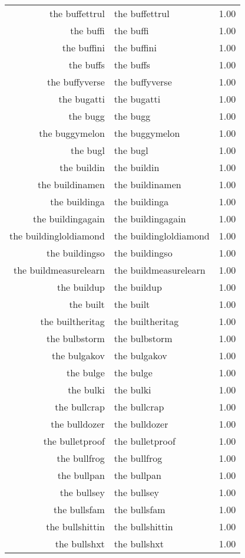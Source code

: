 \begin{table}[ht]
\begin{tabular}{rlr}
  the buffettrul & the buffettrul & 1.00 \\ 
  the buffi & the buffi & 1.00 \\ 
  the buffini & the buffini & 1.00 \\ 
  the buffs & the buffs & 1.00 \\ 
  the buffyverse & the buffyverse & 1.00 \\ 
  the bugatti & the bugatti & 1.00 \\ 
  the bugg & the bugg & 1.00 \\ 
  the buggymelon & the buggymelon & 1.00 \\ 
  the bugl & the bugl & 1.00 \\ 
  the buildin & the buildin & 1.00 \\ 
  the buildinamen & the buildinamen & 1.00 \\ 
  the buildinga & the buildinga & 1.00 \\ 
  the buildingagain & the buildingagain & 1.00 \\ 
  the buildingloldiamond & the buildingloldiamond & 1.00 \\ 
  the buildingso & the buildingso & 1.00 \\ 
  the buildmeasurelearn & the buildmeasurelearn & 1.00 \\ 
  the buildup & the buildup & 1.00 \\ 
  the built & the built & 1.00 \\ 
  the builtheritag & the builtheritag & 1.00 \\ 
  the bulbstorm & the bulbstorm & 1.00 \\ 
  the bulgakov & the bulgakov & 1.00 \\ 
  the bulge & the bulge & 1.00 \\ 
  the bulki & the bulki & 1.00 \\ 
  the bullcrap & the bullcrap & 1.00 \\ 
  the bulldozer & the bulldozer & 1.00 \\ 
  the bulletproof & the bulletproof & 1.00 \\ 
  the bullfrog & the bullfrog & 1.00 \\ 
  the bullpan & the bullpan & 1.00 \\ 
  the bullsey & the bullsey & 1.00 \\ 
  the bullsfam & the bullsfam & 1.00 \\ 
  the bullshittin & the bullshittin & 1.00 \\ 
  the bullshxt & the bullshxt & 1.00 \\ 

\end{tabular}
\end{table}
